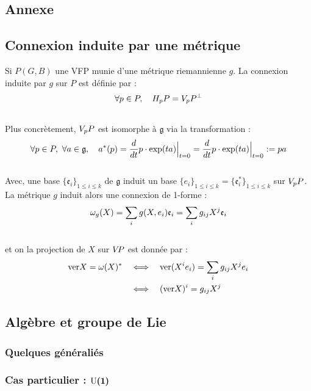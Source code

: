


\begin{annexe}

\section{Annexe}

\subsection{Connexion induite par une métrique} \label{ann:conn2submer_riemanian}

Si $P(G,B)$ une VFP munie d'une métrique riemannienne $g$. La connexion induite par $g$ sur $P$ est définie par :
\begin{equation}
	\forall p\in P,\quad \hg[p]{P} = \vg[p]{P}^\perp
\end{equation}
\\
Plus concrètement, $\vg[p]{P}$ est isomorphe à $\mathfrak{g}$ via la transformation :
\[\forall p\in P,\ \forall a\in\mathfrak{g},\quad a^*(p) = \frac{d}{dt} p\cdot \exp(t a)\Big|_{t=0} = \frac{d}{dt} p\cdot \exp(t a)\Big|_{t=0}\defeq pa\]
\\
Avec, une base $\{\mathfrak{e}_i\}_{1\leq i\leq k}$ de $\mathfrak{g}$ induit un base $\{e_i\}_{1\leq i\leq k} = \{\mathfrak{e}^*_i\}_{1\leq i\leq k}$ sur $\vg[p]{P}$. La métrique $g$ induit alors une connexion de 1-forme :
\[\conn_g(X) = \sum_i g(X, e_i) \mathfrak{e}_i = \sum_i g_{ij}X^j \mathfrak{e}_i\]
\\
et on la projection de $X$ sur $\vg{P}$ est donnée par :
\begin{align*}
	\ver X = \conn(X)^*\quad &\Llr\quad  \ver (X^ie_i) = \sum_i g_{ij}X^j e_i \\
	&\Llr\quad  (\ver X)^i = g_{ij}X^j
\end{align*}


\subsection{Algèbre et groupe de Lie} \label{ann:2Lie}

\subsubsection{Quelques généraliés}

\subsubsection{Cas particulier : $\bf{\U{1}}$}




\end{annexe}
